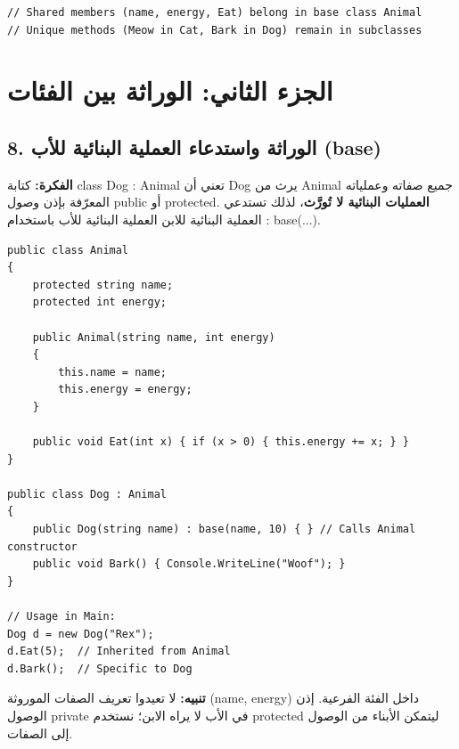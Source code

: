 \documentclass[14pt]{extarticle}
\begin{document}
\begin{boxCode}
\begin{english}
\begin{verbatim}
// Shared members (name, energy, Eat) belong in base class Animal
// Unique methods (Meow in Cat, Bark in Dog) remain in subclasses
\end{verbatim}
\end{english}
\end{boxCode}

\filbreak
\section*{الجزء الثاني: الوراثة بين الفئات}

\subsection*{8. الوراثة واستدعاء العملية البنائية للأب (\textenglish{base})}
\textbf{الفكرة:} كتابة \textenglish{class Dog : Animal} تعني أن \textenglish{Dog} يرث من \textenglish{Animal} جميع صفاته وعملياته المعرّفة بإذن وصول \textenglish{public} أو \textenglish{protected}. \textbf{العمليات البنائية لا تُورَّث}، لذلك تستدعي العملية البنائية للابن العملية البنائية للأب باستخدام \textenglish{: base(...)}.

\begin{boxCode}
\begin{english}
\begin{verbatim}
public class Animal
{
    protected string name;
    protected int energy;

    public Animal(string name, int energy)
    {
        this.name = name;
        this.energy = energy;
    }

    public void Eat(int x) { if (x > 0) { this.energy += x; } }
}

public class Dog : Animal
{
    public Dog(string name) : base(name, 10) { } // Calls Animal constructor
    public void Bark() { Console.WriteLine("Woof"); }
}

// Usage in Main:
Dog d = new Dog("Rex");
d.Eat(5);  // Inherited from Animal
d.Bark();  // Specific to Dog
\end{verbatim}
\end{english}
\end{boxCode}

\textbf{تنبيه:} لا تعيدوا تعريف الصفات الموروثة (\textenglish{name}, \textenglish{energy}) داخل الفئة الفرعية. إذن الوصول \textenglish{private} في الأب لا يراه الابن؛ نستخدم \textenglish{protected} ليتمكن الأبناء من الوصول إلى الصفات.
\end{document}
